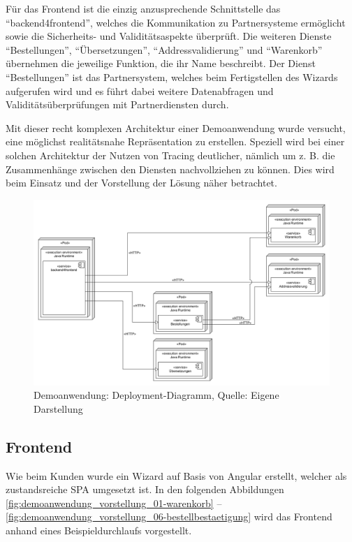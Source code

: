 Für das Frontend ist die einzig anzusprechende Schnittstelle das \enquote{backend4frontend}, welches die Kommunikation zu Partnersysteme ermöglicht sowie die Sicherheits- und Validitätsaspekte überprüft. Die weiteren Dienste \enquote{Bestellungen}, \enquote{Übersetzungen}, \enquote{Addressvalidierung} und \enquote{Warenkorb} übernehmen die jeweilige Funktion, die ihr Name beschreibt. Der Dienst \enquote{Bestellungen} ist das Partnersystem, welches beim Fertigstellen des Wizards aufgerufen wird und es führt dabei weitere Datenabfragen und Validitätsüberprüfungen mit Partnerdiensten durch.

Mit dieser recht komplexen Architektur einer Demoanwendung wurde versucht, eine möglichst realitätsnahe Repräsentation zu erstellen. Speziell wird bei einer solchen Architektur der Nutzen von Tracing deutlicher, nämlich um z. B. die Zusammenhänge zwischen den Diensten nachvollziehen zu können. Dies wird beim Einsatz und der Vorstellung der Lösung näher betrachtet.

\begin{figure}[H]
	\centering
	\includegraphics[width=1.00\linewidth]{img/04_erstellung-poc/demoanwendung_deployment.png}
	\caption{Demoanwendung: Deployment-Diagramm, Quelle: Eigene Darstellung}
	\label{fig:demoanwendung_deployment}
\end{figure}

\newpage

\subsection{Frontend}

Wie beim Kunden wurde ein Wizard auf Basis von Angular erstellt, welcher als zustandsreiche SPA umgesetzt ist. In den folgenden Abbildungen \ref{fig:demoanwendung_vorstellung_01-warenkorb} -- \ref{fig:demoanwendung_vorstellung_06-bestellbestaetigung} wird das Frontend anhand eines Beispieldurchlaufs vorgestellt.

